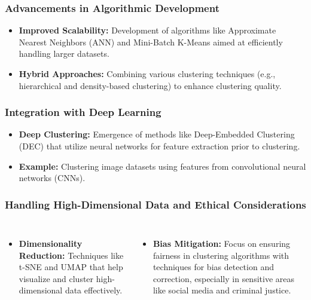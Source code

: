 \documentclass[aspectratio=169]{beamer}
\begin{document}
\begin{frame}[fragile]
    \frametitle{Advancements in Algorithmic Development}
    \begin{itemize}
        \item \textbf{Improved Scalability:} Development of algorithms like Approximate Nearest Neighbors (ANN) and Mini-Batch K-Means aimed at efficiently handling larger datasets.
        \item \textbf{Hybrid Approaches:} Combining various clustering techniques (e.g., hierarchical and density-based clustering) to enhance clustering quality.
    \end{itemize}
\end{frame}

\begin{frame}[fragile]
    \frametitle{Integration with Deep Learning}
    \begin{itemize}
        \item \textbf{Deep Clustering:} Emergence of methods like Deep-Embedded Clustering (DEC) that utilize neural networks for feature extraction prior to clustering.
        \item \textbf{Example:} Clustering image datasets using features from convolutional neural networks (CNNs).
    \end{itemize}
\end{frame}

\begin{frame}[fragile]
    \frametitle{Handling High-Dimensional Data and Ethical Considerations}
    \begin{columns}
        \begin{itemize}
            \item \textbf{Dimensionality Reduction:} Techniques like t-SNE and UMAP that help visualize and cluster high-dimensional data effectively.
        \end{itemize}
        
        \begin{itemize}
            \item \textbf{Bias Mitigation:} Focus on ensuring fairness in clustering algorithms with techniques for bias detection and correction, especially in sensitive areas like social media and criminal justice.
        \end{itemize}
    \end{columns}
\end{frame}
\end{document}
